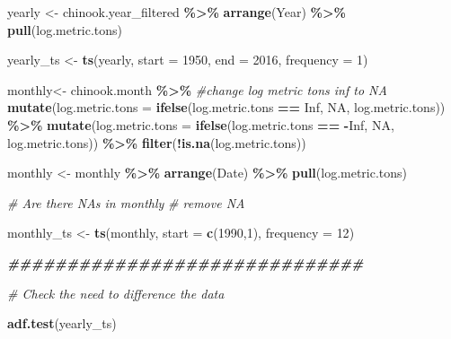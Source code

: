 \documentclass[
]{article}
\newenvironment{Shaded}{\begin{snugshade}}{\end{snugshade}}
\newcommand{\AttributeTok}[1]{\textcolor[rgb]{0.13,0.29,0.53}{#1}}
\newcommand{\CommentTok}[1]{\textcolor[rgb]{0.56,0.35,0.01}{\textit{#1}}}
\newcommand{\ConstantTok}[1]{\textcolor[rgb]{0.56,0.35,0.01}{#1}}
\newcommand{\DecValTok}[1]{\textcolor[rgb]{0.00,0.00,0.81}{#1}}
\newcommand{\DocumentationTok}[1]{\textcolor[rgb]{0.56,0.35,0.01}{\textbf{\textit{#1}}}}
\newcommand{\FunctionTok}[1]{\textcolor[rgb]{0.13,0.29,0.53}{\textbf{#1}}}
\newcommand{\NormalTok}[1]{#1}
\newcommand{\OtherTok}[1]{\textcolor[rgb]{0.56,0.35,0.01}{#1}}
\newcommand{\SpecialCharTok}[1]{\textcolor[rgb]{0.81,0.36,0.00}{\textbf{#1}}}
\begin{document}
\begin{Shaded}
\begin{Highlighting}[]
\NormalTok{yearly }\OtherTok{\textless{}{-}}\NormalTok{ chinook.year\_filtered }\SpecialCharTok{\%\textgreater{}\%} 
  \FunctionTok{arrange}\NormalTok{(Year) }\SpecialCharTok{\%\textgreater{}\%}
  \FunctionTok{pull}\NormalTok{(log.metric.tons)}

\NormalTok{yearly\_ts }\OtherTok{\textless{}{-}} \FunctionTok{ts}\NormalTok{(yearly, }\AttributeTok{start =} \DecValTok{1950}\NormalTok{, }\AttributeTok{end =} \DecValTok{2016}\NormalTok{, }\AttributeTok{frequency =} \DecValTok{1}\NormalTok{)}


\NormalTok{monthly}\OtherTok{\textless{}{-}}\NormalTok{ chinook.month }\SpecialCharTok{\%\textgreater{}\%}
  \CommentTok{\#change log metric tons inf to NA}
  \FunctionTok{mutate}\NormalTok{(}\AttributeTok{log.metric.tons =} \FunctionTok{ifelse}\NormalTok{(log.metric.tons }\SpecialCharTok{==} \ConstantTok{Inf}\NormalTok{, }\ConstantTok{NA}\NormalTok{, log.metric.tons)) }\SpecialCharTok{\%\textgreater{}\%}
  \FunctionTok{mutate}\NormalTok{(}\AttributeTok{log.metric.tons =} \FunctionTok{ifelse}\NormalTok{(log.metric.tons }\SpecialCharTok{==} \SpecialCharTok{{-}}\ConstantTok{Inf}\NormalTok{, }\ConstantTok{NA}\NormalTok{, log.metric.tons)) }\SpecialCharTok{\%\textgreater{}\%}
  \FunctionTok{filter}\NormalTok{(}\SpecialCharTok{!}\FunctionTok{is.na}\NormalTok{(log.metric.tons))}

\NormalTok{monthly }\OtherTok{\textless{}{-}}\NormalTok{ monthly }\SpecialCharTok{\%\textgreater{}\%}
  \FunctionTok{arrange}\NormalTok{(Date) }\SpecialCharTok{\%\textgreater{}\%}
  \FunctionTok{pull}\NormalTok{(log.metric.tons)}

\CommentTok{\# Are there NAs in monthly }
\CommentTok{\# remove NA}

\NormalTok{monthly\_ts }\OtherTok{\textless{}{-}} \FunctionTok{ts}\NormalTok{(monthly, }\AttributeTok{start =} \FunctionTok{c}\NormalTok{(}\DecValTok{1990}\NormalTok{,}\DecValTok{1}\NormalTok{), }\AttributeTok{frequency =} \DecValTok{12}\NormalTok{)}


\DocumentationTok{\#\#\#\#\#\#\#\#\#\#\#\#\#\#\#\#\#\#\#\#\#\#\#\#\#\#\#\#\#\#}

\CommentTok{\# Check the need to difference the data }

\FunctionTok{adf.test}\NormalTok{(yearly\_ts)}
\end{Highlighting}
\end{Shaded}
\end{document}
